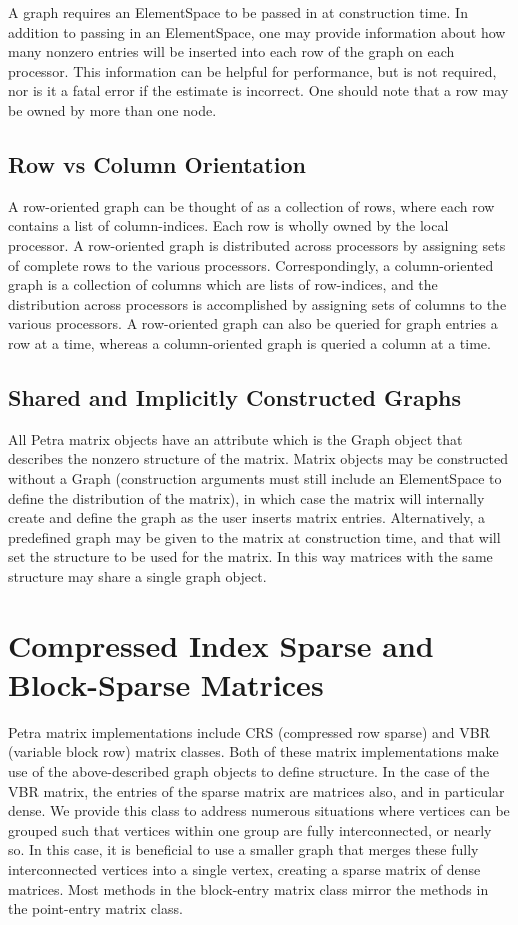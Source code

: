 \documentclass[10pt,relax]{PetraObjectModel}
\begin{document}
A graph requires an ElementSpace to be passed in at construction time.
In addition to passing in an ElementSpace, one may provide
information about how many nonzero entries will be inserted into each row
of the graph on each processor.  This information can be helpful for
performance, but is not required, nor is it a fatal error if the estimate
is incorrect.  One should note that a row may be owned by more than one node.

\subsection{Row vs Column Orientation}
A row-oriented graph can be thought of as a collection of rows, where each row
contains a list of column-indices. Each row is wholly owned by the local
processor. A row-oriented graph is distributed across processors by assigning
sets of complete rows to the various processors. Correspondingly, a
column-oriented graph is a collection of columns which are lists of row-indices,
and the distribution across processors is accomplished by assigning sets of
columns to the various processors.
A row-oriented graph can also be queried for graph entries a row at a time,
whereas a column-oriented graph is queried a column at a time.

\subsection{Shared and Implicitly Constructed Graphs}
All Petra matrix objects have an attribute which is the Graph object that
describes the nonzero structure of the matrix. Matrix objects may be constructed
without a Graph (construction arguments must still include an ElementSpace to
define the
distribution of the matrix), in which case the matrix will internally create
and define the graph as the user inserts matrix entries. Alternatively, a
predefined graph
may be given to the matrix at construction time, and that will set the
structure to be used for the matrix. In this way matrices with the same
structure may share a single graph object.

\section{Compressed Index Sparse and Block-Sparse Matrices}
Petra matrix implementations include CRS (compressed row sparse) and
VBR (variable block row) matrix classes. Both of these matrix implementations
make use of the above-described graph objects to define structure.
In the case of the VBR matrix, the entries of the sparse
matrix are matrices also, and in particular dense.  We provide this class
to address numerous situations where vertices can be grouped such that
vertices within one group are fully interconnected, or nearly so.  In this
case, it is beneficial to use a smaller graph that merges these fully
interconnected vertices into a single vertex, creating a sparse matrix of
dense matrices.  Most methods in the block-entry matrix class mirror the
methods in the point-entry matrix class.
\end{document}
